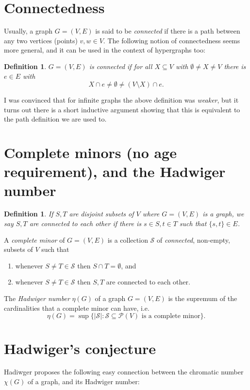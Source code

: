 \documentclass[12pt, a4paper]{amsart}
\newtheorem{definition}[lemma]{\bf Definition}
\begin{document}
\section{Connectedness}
Usually, a graph $G=(V,E)$ is said to be {\em connected} if there is
a path between any two vertices (points) $v, w\in V$. The following
notion of connectedness seems more general, and it can be
used in the context of hypergraphs too:
\begin{definition}
$G = (V,E)$ is {\em connected} if for all $X\subseteq V$ with 
$\emptyset \neq X \neq V$ there is $e\in E$ with 
	$$X \cap e \neq \emptyset \neq (V\setminus X)\cap e.$$
\end{definition}
I was convinced that for infinite graphs the above definition
was {\em weaker}, but it turns out there is a short inductive
argument showing that this is equivalent to the path definition
we are used to.
\section{Complete minors (no age requirement), and the Hadwiger number}
\begin{definition}
If $S, T$ are disjoint subsets of $V$ where $G=(V,E)$ is a graph,
	we say $S,T$ are {\em connected to each other} if there
	is $s\in S, t\in T$ such that $\{s,t\} \in E$.
\end{definition}
A {\em complete minor} of $G=(V,E)$ is a collection ${\mathcal S}$ 
of {\em connected}, non-empty, subsets of $V$ such that
\begin{enumerate}
	\item whenever $S\neq T\in {\mathcal S}$ then $S\cap T = \emptyset$, and
	\item whenever $S\neq T\in {\mathcal S}$ then $S, T$ are connected
		to each other.
\end{enumerate}
The {\em Hadwiger number} $\eta(G)$ of a graph $G=(V,E)$ is the supremum
of the cardinalities that a complete minor can have, i.e.
$$\eta(G) = \sup\{|{\mathcal S}|: {\mathcal S}\subseteq {\mathcal P}(V) \text{ is
a complete minor}\}.$$

\section{Hadwiger's conjecture}
Hadiwger proposes the following easy connection between the
chromatic number $\chi(G)$ of a graph, and its Hadwiger number:

\vspace*{2mm}
\end{document}

